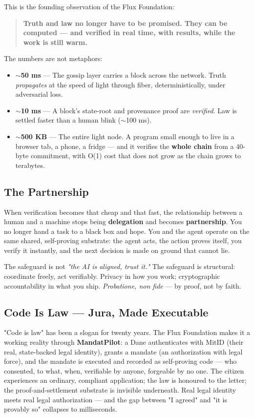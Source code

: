 \documentclass[11pt,a4paper]{article}
\begin{document}
This is the founding observation of the Flux Foundation:

\begin{quote}
\textbf{Truth and law no longer have to be promised. They can be computed — and verified in real time, with results, while the work is still warm.}
\end{quote}

The numbers are not metaphors:
\begin{itemize}
\item \textbf{$\sim$50 ms} — The gossip layer carries a block across the network. Truth \textit{propagates} at the speed of light through fiber, deterministically, under adversarial loss.
\item \textbf{$\sim$10 ms} — A block's state-root and provenance proof are \textit{verified}. Law is settled faster than a human blink ($\sim$100 ms).
\item \textbf{$\sim$500 KB} — The entire light node. A program small enough to live in a browser tab, a phone, a fridge — and it verifies the \textbf{whole chain} from a 40-byte commitment, with O(1) cost that does not grow as the chain grows to terabytes.
\end{itemize}

\subsection{The Partnership}

When verification becomes that cheap and that fast, the relationship between a human and a machine stops being \textbf{delegation} and becomes \textbf{partnership}. You no longer hand a task to a black box and hope. You and the agent operate on the same shared, self-proving substrate: the agent acts, the action proves itself, you verify it instantly, and the next decision is made on ground that cannot lie.

The safeguard is not \textit{"the AI is aligned, trust it."} The safeguard is structural: coordinate freely, act verifiably. Privacy in how you work; cryptographic accountability in what you ship. \textit{Probatione, non fide} — by proof, not by faith.

\subsection{Code Is Law — Jura, Made Executable}

"Code is law" has been a slogan for twenty years. The Flux Foundation makes it a working reality through \textbf{MandatPilot}: a Dane authenticates with MitID (their real, state-backed legal identity), grants a mandate (an authorization with legal force), and the mandate is executed and recorded as self-proving code — who consented, to what, when, verifiable by anyone, forgeable by no one. The citizen experiences an ordinary, compliant application; the law is honoured to the letter; the proof-and-settlement substrate is invisible underneath. Real legal identity meets real legal authorization — and the gap between "I agreed" and "it is provably so" collapses to milliseconds.
\end{document}
